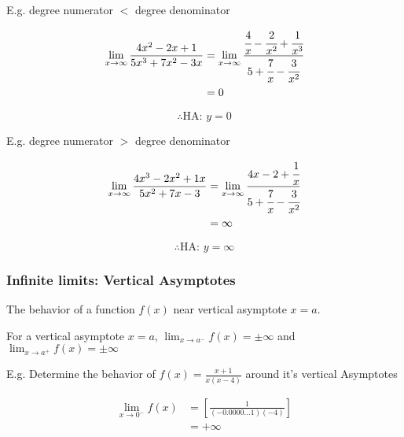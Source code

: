 \documentclass{article}
\begin{document}
\bigskip

\noindent E.g. degree numerator $<$ degree denominator

\begin{align*}
    \lim_{x \to \infty} \frac{4x^{2} - 2x + 1}{5x^{3} + 7x^{2} - 3x} & =
    \lim_{x \to \infty} \cfrac{\cfrac{4}{x} - \cfrac{2}{x^{2}} + \cfrac{1}{x^{3}}}{5 + \cfrac{7}{x} - \cfrac{3}{x^{2}}} \\
                                                                     & = 0
\end{align*}

\begin{equation*}
    \therefore \text{HA: } y = 0
\end{equation*}

\bigskip

\noindent E.g. degree numerator $>$ degree denominator

\begin{align*}
    \lim_{x \to \infty} \frac{4x^{3} - 2x^{2} + 1x}{5x^{2} + 7x - 3} & =
    \lim_{x \to \infty} \cfrac{4x - 2 + \cfrac{1}{x}}{5 + \cfrac{7}{x} - \cfrac{3}{x^{2}}} \\
                                                                     & = \infty
\end{align*}

\begin{equation*}
    \therefore \text{HA: } y = \infty
\end{equation*}

\clearpage

\subsubsection{Infinite limits: Vertical Asymptotes}

The behavior of a function $f(x)$ near vertical asymptote $x=a$.

\medskip

\noindent For a vertical asymptote $x=a$, $\displaystyle \lim_{x \to a^{-}} f(x) = \pm \infty$ and
$\displaystyle \lim_{x \to a^{+}} f(x) = \pm \infty$

\bigskip

\noindent E.g. Determine the behavior of $\displaystyle f(x) = \frac{x+1}{x(x-4)}$ around it's vertical Asymptotes

\begin{align*}
    \lim_{x \to 0^{-}} f(x) & = \left[ \frac{1}{(-0.0000\ldots1)(-4)} \right] \\
                            & = +\infty
\end{align*}
\end{document}
